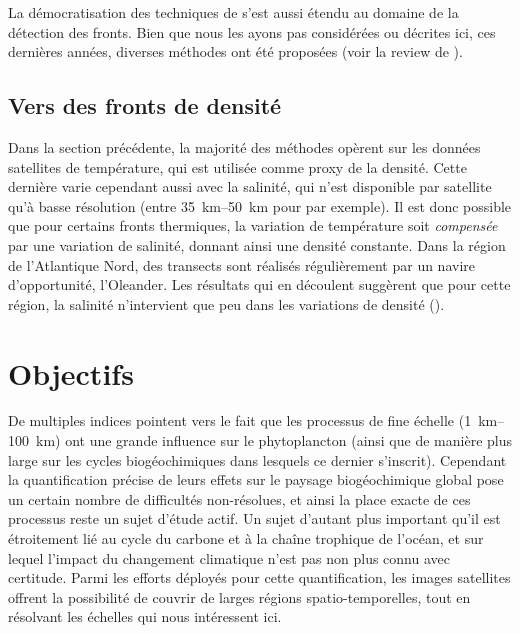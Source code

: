 \begin{note}
  La démocratisation des techniques de  s'est aussi étendu au domaine de la détection des fronts.
  Bien que nous les ayons pas considérées ou décrites ici, ces dernières années, diverses méthodes ont été proposées (voir la review de \cite{liu_2022}).
\end{note}

\subsection{Vers des fronts de densité}

Dans la section précédente, la majorité des méthodes opèrent sur les données satellites de température, qui est utilisée comme proxy de la densité.
Cette dernière varie cependant aussi avec la salinité, qui n'est disponible par satellite qu'à basse résolution (entre \qtyrange[range-phrase={ et }]{35}{50}{\km} pour  par exemple).
Il est donc possible que pour certains fronts thermiques, la variation de température soit \emph{compensée} par une variation de salinité, donnant ainsi une densité constante.
Dans la région de l'Atlantique Nord, des transects sont réalisés régulièrement par un navire d'opportunité, l'Oleander.
Les résultats qui en découlent suggèrent que pour cette région, la salinité n'intervient que peu dans les variations de densité (\cite{flagg_2006}).

\enlargethispage*{2\onelineskip}

\section{Objectifs}
\label{sec:problematique}

De multiples indices pointent vers le fait que les processus de fine échelle \OM(\qtyrange{1}{100}{\km}) ont une grande influence sur le phytoplancton (ainsi que de manière plus large sur les cycles biogéochimiques dans lesquels ce dernier s'inscrit).
Cependant la quantification précise de leurs effets sur le paysage biogéochimique global pose un certain nombre de difficultés non-résolues, et ainsi la place exacte de ces processus reste un sujet d'étude actif.
Un sujet d'autant plus important qu'il est étroitement lié au cycle du carbone et à la chaîne trophique de l'océan, et sur lequel l'impact du changement climatique n'est pas non plus connu avec certitude.
Parmi les efforts déployés pour cette quantification, les images satellites offrent la possibilité de couvrir de larges régions spatio-temporelles, tout en résolvant les échelles qui nous intéressent ici.


